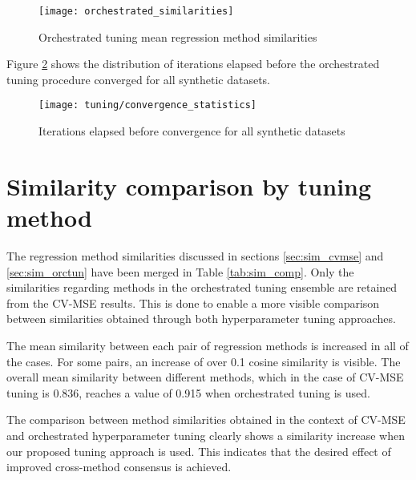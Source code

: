 

\begin{figure}[H]
	\centering
	\texttt{[image: orchestrated\_similarities]}
	\caption{Orchestrated tuning mean regression method similarities}
	\label{fig:sim_orctun}
\end{figure}

Figure \ref{fig:conv_orctun} shows the distribution of iterations elapsed before the orchestrated tuning procedure converged for all synthetic datasets.

\begin{figure}[H]
	\centering
	\texttt{[image: tuning/convergence\_statistics]}
	\caption{Iterations elapsed before convergence for all synthetic datasets}
	\label{fig:conv_orctun}
\end{figure}


\section{Similarity comparison by tuning method}
The regression method similarities discussed in sections \ref{sec:sim_cvmse} and \ref{sec:sim_orctun} have been merged in Table \ref{tab:sim_comp}. Only the similarities regarding methods in the orchestrated tuning ensemble are retained from the CV-MSE results. This is done to enable a more visible comparison between similarities obtained through both hyperparameter tuning approaches.

The mean similarity between each pair of regression methods is increased in all of the cases. For some pairs, an increase of over 0.1 cosine similarity is visible. The overall mean similarity between different methods, which in the case of CV-MSE tuning is 0.836, reaches a value of 0.915 when orchestrated tuning is used. 



The comparison between method similarities obtained in the context of CV-MSE and orchestrated hyperparameter tuning clearly shows a similarity increase when our proposed tuning approach is used. This indicates that the desired effect of improved cross-method consensus is achieved. 